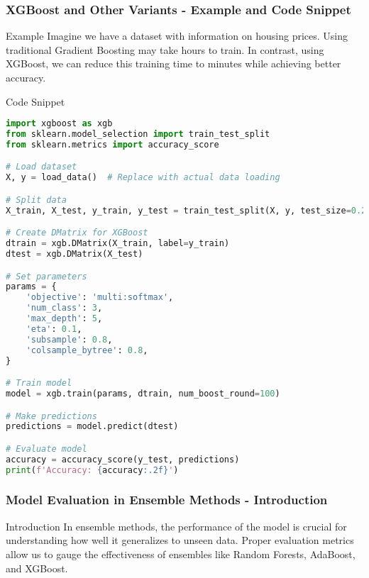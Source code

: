 \documentclass[aspectratio=169]{beamer}
\begin{document}
\begin{frame}[fragile]
    \frametitle{XGBoost and Other Variants - Example and Code Snippet}
    \begin{block}{Example}
        Imagine we have a dataset with information on housing prices. 
        Using traditional Gradient Boosting may take hours to train. 
        In contrast, using XGBoost, we can reduce this training time to minutes while achieving better accuracy.
    \end{block}
    
    \begin{block}{Code Snippet}
        \begin{lstlisting}[language=Python]
import xgboost as xgb
from sklearn.model_selection import train_test_split
from sklearn.metrics import accuracy_score

# Load dataset
X, y = load_data()  # Replace with actual data loading

# Split data
X_train, X_test, y_train, y_test = train_test_split(X, y, test_size=0.2, random_state=42)

# Create DMatrix for XGBoost
dtrain = xgb.DMatrix(X_train, label=y_train)
dtest = xgb.DMatrix(X_test)

# Set parameters
params = {
    'objective': 'multi:softmax',
    'num_class': 3,
    'max_depth': 5,
    'eta': 0.1,
    'subsample': 0.8,
    'colsample_bytree': 0.8,
}

# Train model
model = xgb.train(params, dtrain, num_boost_round=100)

# Make predictions
predictions = model.predict(dtest)

# Evaluate model
accuracy = accuracy_score(y_test, predictions)
print(f'Accuracy: {accuracy:.2f}')
        \end{lstlisting}
    \end{block}
\end{frame}

\begin{frame}[fragile]
    \frametitle{Model Evaluation in Ensemble Methods - Introduction}
    \begin{block}{Introduction}
        In ensemble methods, the performance of the model is crucial for understanding how well it generalizes to unseen data. Proper evaluation metrics allow us to gauge the effectiveness of ensembles like Random Forests, AdaBoost, and XGBoost.
    \end{block}
\end{frame}
\end{document}

